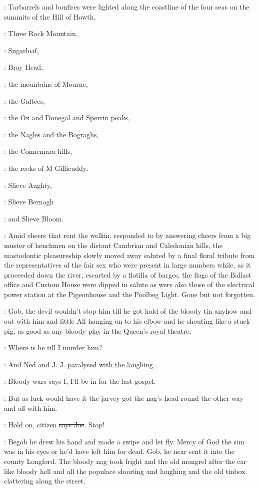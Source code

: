 :
Tarbarrels and bonfires were lighted along the coastline
of the four seas on the summits of
the Hill of Howth,

:
Three Rock Mountain,

:
Sugarloaf,

:
Bray Head,

:
the mountains of Mourne,

:
the Galtees,

:
the Ox and Donegal and Sperrin peaks,

:
the Nagles and the Bograghs,

:
the Connemara hills,

:
the reeks of M Gillicuddy,

:
Slieve Aughty,

:
Slieve Bernagh

:
and Slieve Bloom.

:
Amid cheers that rent the welkin, responded to by answering cheers from a big
muster of henchmen on the distant Cambrian and Caledonian hills, the
mastodontic pleasureship slowly moved away saluted by a final floral
tribute from the representatives of the fair sex who were present in large
numbers while, as it proceeded down the river, escorted by a flotilla of
barges, the flags of the Ballast office and Custom House were dipped in
salute as were also those of the electrical power station at the
Pigeonhouse and the Poolbeg Light.  Gone but not forgotten.

\Nq:
Gob, the devil wouldn't stop him till he got hold of the bloody tin
anyhow and out with him and little Alf hanging on to his elbow and he
shouting like a stuck pig, as good as any bloody play in the Queen's royal
theatre:

\citizen:
Where is he till I murder him?

\Nq:
And Ned and J. J. paralysed with the laughing.

:
Bloody wars \sout{says I},
I'll be in for the last gospel.

\Nq:
But as luck would have it the jarvey got the nag's head round the
other way and off with him.

\joe:
Hold on, citizen \sout{says Joe}. Stop!

\Nq:
Begob he drew his hand and made a swipe and let fly. Mercy of God the sun
was in his eyes or he'd have left him for dead. Gob, he near sent it
into the county Longford. The bloody nag took fright and the old mongrel
after the car like bloody hell and all the populace shouting and laughing
and the old tinbox clattering along the street.

